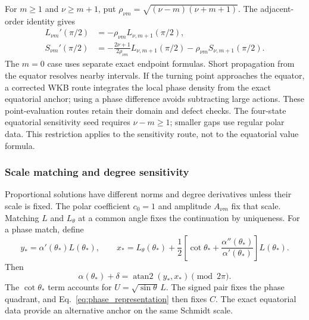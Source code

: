 ﻿\documentclass[11pt,a4paper]{article}
\begin{document}
For $m\geq1$ and $\nu\geq m+1$, put $\rho_{\nu m}=\sqrt{(\nu-m)(\nu+m+1)}$. The adjacent-order identity gives
\begin{align}
 L_{\nu m}'(\pi/2)&=-\rho_{\nu m}L_{\nu,m+1}(\pi/2),\\
 S_{\nu m}'(\pi/2)&=-\frac{2\nu+1}{2\rho_{\nu m}}L_{\nu,m+1}(\pi/2)
 -\rho_{\nu m}S_{\nu,m+1}(\pi/2).
 \label{eq:legendre_equator_mixed_sensitivity}
\end{align}
The $m=0$ case uses separate exact endpoint formulas. Short propagation from the equator resolves nearby intervals. If the turning point approaches the equator, a corrected WKB route integrates the local phase density from the exact equatorial anchor; using a phase difference avoids subtracting large actions. These point-evaluation routes retain their domain and defect checks. The four-state equatorial sensitivity seed requires $\nu-m\geq1$; smaller gaps use regular polar data. This restriction applies to the sensitivity route, not to the equatorial value formula.

\subsubsection{Scale matching and degree sensitivity}

Proportional solutions have different norms and degree derivatives unless their scale is fixed. The polar coefficient $c_0=1$ and amplitude $A_{\nu m}$ fix that scale. Matching $L$ and $L_\theta$ at a common angle fixes the continuation by uniqueness. For a phase match, define
\begin{equation}
 y_*=\alpha'(\theta_*)L(\theta_*),\qquad
 x_*=L_\theta(\theta_*)+
 \frac12\left[\cot\theta_*+\frac{\alpha''(\theta_*)}{\alpha'(\theta_*)}\right]L(\theta_*).
\end{equation}
Then
\begin{equation}
 \alpha(\theta_*)+\delta=\operatorname{atan2}(y_*,x_*)\pmod{2\pi}.
 \label{eq:phase_match}
\end{equation}
The $\cot\theta_*$ term accounts for $U=\sqrt{\sin\theta}\,L$. The signed pair fixes the phase quadrant, and Eq.~\eqref{eq:phase_representation} then fixes $C$. The exact equatorial data provide an alternative anchor on the same Schmidt scale.
\end{document}
